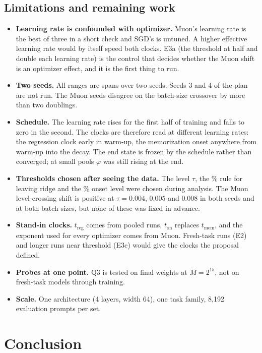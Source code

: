 \documentclass[11pt]{article}
\newcommand{\treg}{t_{\mathrm{reg}}}
\newcommand{\tmem}{t_{\mathrm{mem}}}
\newcommand{\ton}{t_{\mathrm{on}}}
\begin{document}
\subsection{Limitations and remaining work}
\label{sec:limits}

\begin{itemize}\setlength{\itemsep}{1pt}
\item \textbf{Learning rate is confounded with optimizer.} Muon's learning rate is the best of three in a short check and SGD's is untuned. A higher effective learning rate would by itself speed both clocks. E3a (the threshold at half and double each learning rate) is the control that decides whether the Muon shift is an optimizer effect, and it is the first thing to run.
\item \textbf{Two seeds.} All ranges are spans over two seeds. Seeds 3 and 4 of the plan are not run. The Muon seeds disagree on the batch-size crossover by more than two doublings.
\item \textbf{Schedule.} The learning rate rises for the first half of training and falls to zero in the second. The clocks are therefore read at different learning rates: the regression clock early in warm-up, the memorization onset anywhere from warm-up into the decay. The end state is frozen by the schedule rather than converged; at small pools $\varphi$ was still rising at the end.
\item \textbf{Thresholds chosen after seeing the data.} The level $\tau$, the \ReboundPct\% rule for leaving ridge and the \OnsetPct\% onset level were chosen during analysis. The Muon level-crossing shift is positive at $\tau = 0.004$, $0.005$ and $0.008$ in both seeds and at both batch sizes, but none of these was fixed in advance.
\item \textbf{Stand-in clocks.} $\treg$ comes from pooled runs, $\ton$ replaces $\tmem$, and the exponent used for every optimizer comes from Muon. Fresh-task runs (E2) and longer runs near threshold (E3c) would give the clocks the proposal defined.
\item \textbf{Probes at one point.} Q3 is tested on final weights at $M = 2^{15}$, not on fresh-task models through training.
\item \textbf{Scale.} One architecture (4 layers, width 64), one task family, 8{,}192 evaluation prompts per set.
\end{itemize}

\section{Conclusion}
\end{document}
